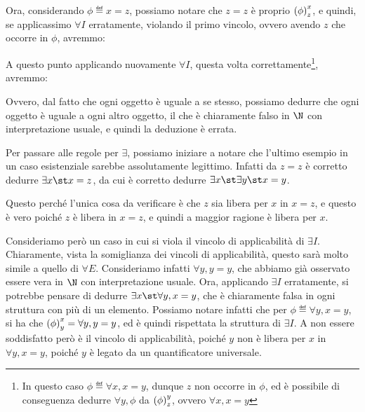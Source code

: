 \begin{prooftree}
\end{prooftree}

Ora, considerando \(\phi \eqdef x=z\), possiamo notare che \(z=z\) è proprio \({{\left(\phi\right)}^{x}_{z}}\), e quindi, se applicassimo \(\forall I\) erratamente, violando il primo vincolo, ovvero avendo \(z\) che occorre in \(\phi\), avremmo:
\begin{prooftree}
\end{prooftree}

A questo punto applicando nuovamente \(\forall I\), questa volta correttamente\footnote{In questo caso \(\phi \eqdef \forall x, x=y\), dunque \(z\) non occorre in \(\phi\), ed è possibile di conseguenza dedurre \(\forall y, \phi\) da \({{\left(\phi\right)}^{y}_{z}}\), ovvero \(\forall x, x=y\)}, avremmo:
\begin{prooftree}
\end{prooftree}
Ovvero, dal fatto che ogni oggetto è uguale a se stesso, possiamo dedurre che ogni oggetto è uguale a ogni altro oggetto, il che è chiaramente falso in \(\N\) con interpretazione usuale, e quindi la deduzione è errata.

Per passare alle regole per \(\exists\), possiamo iniziare a notare che l'ultimo esempio in un caso esistenziale sarebbe assolutamente legittimo.
Infatti da \(z=z\) è corretto dedurre \(\exists x\st x=z\), da cui è corretto dedurre \(\exists x\st \exists y\st x=y\).

Questo perché l'unica cosa da verificare è che \(z\) sia libera per \(x\) in \(x=z\), e questo è vero poiché \(z\) è libera in \(x=z\), e quindi a maggior ragione è libera per \(x\).

Consideriamo però un caso in cui si viola il vincolo di applicabilità di \(\exists I\). Chiaramente, vista la somiglianza dei vincoli di applicabilità, questo sarà molto simile a quello di \(\forall E\). Consideriamo infatti \(\forall y, y = y\), che abbiamo già osservato essere vera in \(\N\) con interpretazione usuale. Ora, applicando \(\exists I\) erratamente, si potrebbe pensare di dedurre \(\exists x\st\forall y, x = y\), che è chiaramente falsa in ogni struttura con più di un elemento. Possiamo notare infatti che per \(\phi \eqdef \forall y, x = y\), si ha che \({{\left(\phi\right)}^{x}_{y}} = \forall y, y = y\), ed è quindi rispettata la struttura di \(\exists I\). A non essere soddisfatto però è il vincolo di applicabilità, poiché \(y\) non è libera per \(x\) in \(\forall y, x = y\), poiché \(y\) è legato da un quantificatore universale.

